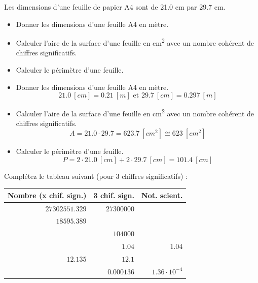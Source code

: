 \documentclass[
  11pt,
  a4paper,
  openany]{book}
\providecommand{\tightlist}{%
  \setlength{\itemsep}{0pt}\setlength{\parskip}{0pt}}
\begin{document}
\newpage

\begin{Exercise}

Les dimensions d'une feuille de papier A4 sont de 21.0 cm par 29.7 cm.

\begin{itemize}
\tightlist
\item
  Donner les dimensions d'une feuille A4 en mètre.
  \vspace{3em}
\item
  Calculer l'aire de la surface d'une feuille en cm\textsuperscript{2} avec un nombre cohérent de chiffres significatifs.
  \vspace{3em}
\item
  Calculer le périmètre d'une feuille.
  \vspace{3em}
\end{itemize}

\end{Exercise}

\begin{Answer}

\begin{itemize}
\tightlist
\item
  Donner les dimensions d'une feuille A4 en mètre.
  \[
  21.0\ [cm] = 0.21\ [m] \text{ et } 29.7\ [cm] = 0.297\ [m]
  \]
\item
  Calculer l'aire de la surface d'une feuille en cm\textsuperscript{2} avec un nombre cohérent de chiffres significatifs.
  \[
  A = 21.0 \cdot 29.7 = 623.7\ [cm^2] ≅ 623\ [cm^2]
  \]
\item
  Calculer le périmètre d'une feuille.
  \[
  P = 2 \cdot 21.0\ [cm] + 2 \cdot 29.7\ [cm] = 101.4\ [cm]
  \]
\end{itemize}

\end{Answer}

\begin{Exercise}
Complétez le tableau suivant (pour 3 chiffres significatifs) :

\end{Exercise}

\begin{longtable}[]{@{}rrr@{}}
\toprule\noalign{}
Nombre (x chif. sign.) & 3 chif. sign. & Not. scient. \\
\midrule\noalign{}
\endhead
\bottomrule\noalign{}
\endlastfoot
\(27302551.329\) & \(27300000\) & \\
\(18595.389\) & & \\
& \(104000\) & \\
& \(1.04\) & \(1.04\) \\
\(12.135\) & \(12.1\) & \\
& \(0.000136\) & \(1.36 \cdot 10^{-4}\) \\
\end{longtable}
\end{document}
